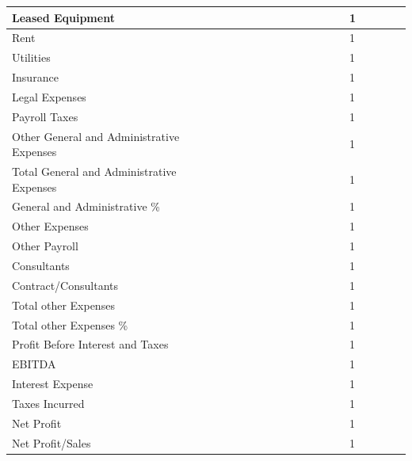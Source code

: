 \documentclass[11pt,a4paper,titlepage]{article}
\begin{document}
\begin{landscape}
\begin{scriptsize}
\begin{tabular}{ | l | l | l | l | l | l | l | l | l | l | l | l | l | l | l | l | l | l |}
  Leased Equipment & & & & & & & & & & & & & 1\\\hline
  Rent & & & & & & & & & & & & & 1\\\hline
  Utilities & & & & & & & & & & & & & 1\\\hline
  Insurance & & & & & & & & & & & & & 1\\\hline
  Legal Expenses & & & & & & & & & & & & & 1\\\hline
  Payroll Taxes & & & & & & & & & & & & & 1\\\hline
  Other General and Administrative Expenses & & & & & & & & & & & & & 1\\\hline
  Total General and Administrative Expenses & & & & & & & & & & & & & 1\\\hline
  General and Administrative \% & & & & & & & & & & & & & 1\\\hline
  Other Expenses & & & & & & & & & & & & & 1\\\hline
  Other Payroll & & & & & & & & & & & & & 1\\\hline
  Consultants & & & & & & & & & & & & & 1\\\hline
  Contract/Consultants & & & & & & & & & & & & & 1\\\hline
  Total other Expenses & & & & & & & & & & & & & 1\\\hline
  Total other Expenses \% & & & & & & & & & & & & & 1\\\hline
  Profit Before Interest and Taxes & & & & & & & & & & & & & 1\\\hline
  EBITDA & & & & & & & & & & & & & 1\\\hline
  Interest Expense & & & & & & & & & & & & & 1\\\hline
  Taxes Incurred & & & & & & & & & & & & & 1\\\hline
  Net Profit & & & & & & & & & & & & & 1\\\hline
  Net Profit/Sales & & & & & & & & & & & & & 1\\\hline
\end{tabular}
\end{scriptsize}
\end{landscape}
\newpage
\thispagestyle{empty}
\end{document}
